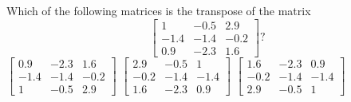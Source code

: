 \begin{activity}
Which of the following matrices is the transpose of the matrix
\begin{equation*}
\begin{bmatrix} 1&-0.5&2.9
\\-1.4&-1.4&-0.2
\\0.9&-2.3&1.6 \end{bmatrix}?
\end{equation*}
{\(\begin{bmatrix} 0.9&-2.3&1.6
\\-1.4&-1.4&-0.2
\\1&-0.5&2.9 \end{bmatrix}\)}
{\(\begin{bmatrix} 2.9&-0.5&1
\\-0.2&-1.4&-1.4
\\1.6&-2.3&0.9 \end{bmatrix}\)}
{\(\begin{bmatrix} 1.6&-2.3&0.9
\\-0.2&-1.4&-1.4
\\2.9&-0.5&1 \end{bmatrix}\)}
\end{activity} 




